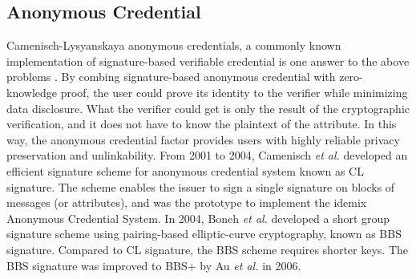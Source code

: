 \subsection{Anonymous Credential}
Camenisch-Lysyanskaya anonymous credentials, a commonly known implementation of signature-based verifiable credential is one answer to the above problems \cite{voelkel2020selectively}\cite{ates2012warning}. By combing signature-based anonymous credential with zero-knowledge proof, the user could prove its identity to the verifier while minimizing data disclosure\cite{morais2019survey}. What the verifier could get is only the result of the cryptographic verification, and it does not have to know the plaintext of the attribute. In this way, the anonymous credential factor provides users with highly reliable privacy preservation and unlinkability. From 2001 to 2004, Camenisch \textit{et al.}\cite{kongsuwan2020anonymous,camenisch2002design} developed an efficient signature scheme for anonymous credential system known as CL signature. The scheme enables the issuer to sign a single signature on blocks of messages (or attributes), and was the prototype to implement the idemix Anonymous Credential System. In 2004, Boneh \textit{et al.}\cite{boneh2004short} developed a short group signature scheme using pairing-based elliptic-curve cryptography, known as BBS signature. Compared to CL signature, the BBS scheme requires shorter keys. The BBS signature was improved to BBS+ by Au \textit{et al.}\cite{au2006constant} in 2006.

